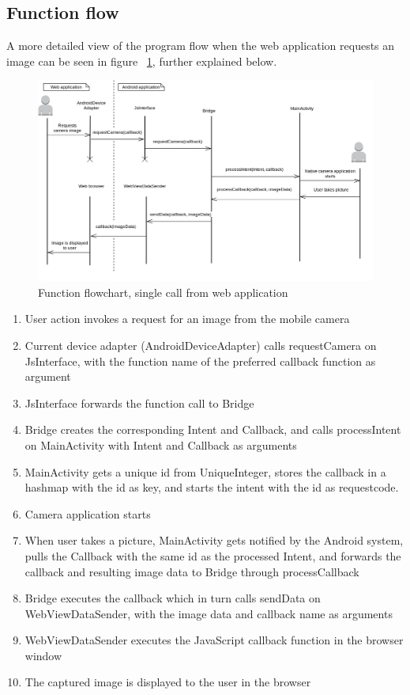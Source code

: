 \subsection{Function flow} \label{sec:nativeflow}
A more detailed view of the program flow when the web application requests an image can be seen in figure ~\ref{fig:nativeflow}, further explained below.
\begin{figure}[h!]
	\centering
    \includegraphics[width=120mm,natwidth=800,natheight=600]{./img/androidfunctionflow.png}
    \caption{Function flowchart, single call from web application}
    \label{fig:nativeflow}
\end{figure}
\begin{enumerate}
	\item User action invokes a request for an image from the mobile camera
	\item Current device adapter (AndroidDeviceAdapter) calls requestCamera on JsInterface, with the function name of the preferred callback function as argument
	\item JsInterface forwards the function call to Bridge
	\item Bridge creates the corresponding Intent and Callback, and calls processIntent on MainActivity with Intent and Callback as arguments
	\item MainActivity gets a unique id from UniqueInteger, stores the callback in a hashmap with the id as key, and starts the intent with the id as requestcode.
	\item Camera application starts
	\item When user takes a picture, MainActivity gets notified by the Android system, pulls the Callback with the same id as the processed Intent, and forwards the callback and resulting image data to Bridge through processCallback
	\item Bridge executes the callback which in turn calls sendData on WebViewDataSender, with the image data and callback name as arguments
	\item WebViewDataSender executes the JavaScript callback function in the browser window
	\item The captured image is displayed to the user in the browser
\end{enumerate}

